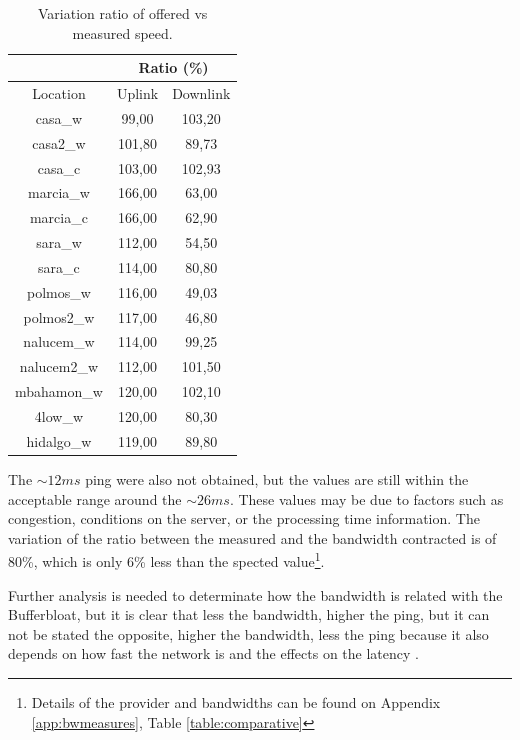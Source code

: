 \begin{table}[ht]
\begin{center}
\begin{tabular}{|c||c|c||}
 \hline
& \multicolumn{2}{|c|}{Ratio (\%)} \\ \hline
Location	& Uplink		& Downlink \\ \hline \hline
casa\_w		& 99,00			& 103,20 \\ \hline
casa2\_w	& 101,80		&  89,73  \\ \hline
casa\_c		& 103,00		& 102,93  \\ \hline
marcia\_w	& 166,00		&  63,00  \\ \hline
marcia\_c	& 166,00		&  62,90  \\ \hline
sara\_w		& 112,00		&  54,50  \\ \hline
sara\_c		& 114,00		&  80,80 \\ \hline
polmos\_w	& 116,00		&  49,03  \\ \hline
polmos2\_w 	& 117,00		&  46,80  \\ \hline
nalucem\_w	& 114,00		&  99,25  \\ \hline
nalucem2\_w & 112,00		& 101,50  \\ \hline
mbahamon\_w & 120,00		& 102,10  \\ \hline
4low\_w	 	& 120,00		&  80,30  \\ \hline
hidalgo\_w 	& 119,00		&  89,80  \\ \hline
\end{tabular}
\caption[Speed Test: Variation ratio of offered vs measured speed ]{Variation ratio of offered vs measured speed.}
\label{table:ratiospeed}
\end{center}
\end{table}

The $\sim12ms$ ping were also not obtained, but the values ​​are still within
the acceptable range around the $\sim26ms$. These values ​​may be due to
factors such as congestion, conditions on the server, or the processing time
information. The variation of the ratio between the measured and the bandwidth
contracted is of 80\%, which is only 6\% less than the spected
value\footnote{Details of the provider and bandwidths can be found on Appendix
\ref{app:bwmeasures}, Table \ref{table:comparative}}.

Further analysis is needed to determinate how the bandwidth is related with
the Bufferbloat, but it is clear that less the bandwidth, higher the ping, but
it can not be stated the opposite, higher the bandwidth, less the ping
because it also depends on how fast the network is and the effects on the
latency \cite{main:ref:3}.
